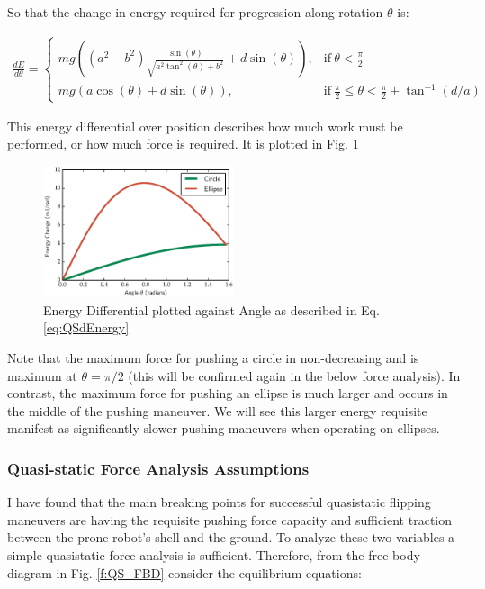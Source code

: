 \documentclass[letterpaper]{report}
\begin{document}
So that the change in energy required for progression along rotation $\theta$ is:

\begin{align}
  \frac{dE}{d\theta} =
  \begin{cases}
    mg ( (a^2 - b^2) \frac{\sin(\theta)}{\sqrt{a^2 \tan^2(\theta) + b^2}} + d \sin(\theta) ), & \text{if}\ \theta < \frac{\pi}{2} \\
    mg (a \cos(\theta) + d \sin(\theta) ), & \text{if}\ \frac{\pi}{2} \leq \theta < \frac{\pi}{2} + \tan^{-1}(d/a)
  \end{cases}
  \label{eq:QSdEnergy}
\end{align}

This energy differential over position describes how much work must be performed, or how much force is required.
It is plotted in Fig. \ref{fig:QSdEnergy}

\begin{figure}
\centering
\includegraphics[width=0.5\textwidth]{dEnergyLandscape.eps}
\caption{\label{fig:QSdEnergy}Energy Differential plotted against Angle as described in Eq. \ref{eq:QSdEnergy}}
\end{figure}

Note that the maximum force for pushing a circle in non-decreasing and is maximum at $\theta = \pi/2$ (this will be confirmed again in the below force analysis).
In contrast, the maximum force for pushing an ellipse is much larger and occurs in the middle of the pushing maneuver.
We will see this larger energy requisite manifest as significantly slower pushing maneuvers when operating on ellipses.

\subsubsection{Quasi-static Force Analysis Assumptions}
I have found that the main breaking points for successful quasistatic flipping maneuvers are having the requisite pushing force capacity and sufficient traction between the prone robot's shell and the ground.
To analyze these two variables a simple quasistatic force analysis is sufficient.
Therefore, from the free-body diagram in Fig. \ref{f:QS_FBD} consider the equilibrium equations:
\end{document}
